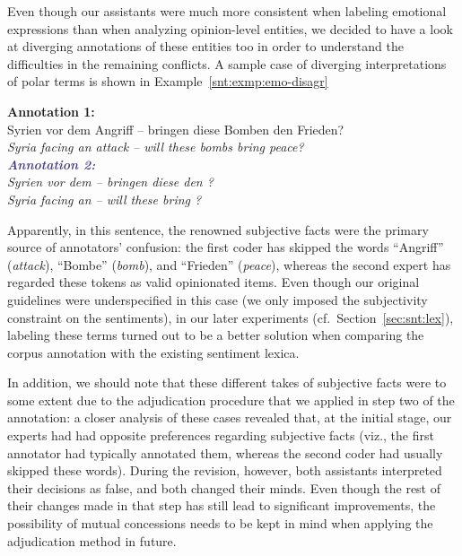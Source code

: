 Even though our assistants were much more consistent when labeling
emotional expressions than when analyzing opinion-level entities, we
decided to have a look at diverging annotations of these entities too
in order to understand the difficulties in the remaining conflicts.  A
sample case of diverging interpretations of polar terms is shown in
Example~\ref{snt:exmp:emo-disagr}

\begin{example}\label{snt:exmp:emo-disagr}
  \textcolor{red3}{\textbf{Annotation 1:}}\\ \upshape{}Syrien vor dem
  Angriff -- bringen diese Bomben den Frieden?\\[0.3em]\itshape
  \noindent\itshape{}Syria facing an attack -- will these bombs bring
  peace?\\

  \noindent\textcolor{darkslateblue}{\textbf{\itshape Annotation
      2:}}\\ \upshape{}Syrien vor dem
  \emoexpression{\textcolor{red}{Angriff}} -- bringen diese
  \emoexpression{\textcolor{red}{Bomben}} den
  \emoexpression{\textcolor{red}{Frieden}}?\\[0.3em]
  \noindent\itshape{}Syria facing an
  \upshape{}\itshape{}
  -- will these
  \upshape{}\itshape{}
  bring
  \upshape{}\itshape{}?
\end{example}

Apparently, in this sentence, the renowned subjective facts were the
primary source of annotators' confusion: the first coder has skipped
the words ``Angriff'' (\emph{attack}), ``Bombe'' (\emph{bomb}), and
``Frieden'' (\emph{peace}), whereas the second expert has regarded
these tokens as valid opinionated items.  Even though our original
guidelines were underspecified in this case (we only imposed the
subjectivity constraint on the sentiments), in our later experiments
(cf.~Section~\ref{sec:snt:lex}), labeling these terms turned out to be
a better solution when comparing the corpus annotation with the
existing sentiment lexica.

In addition, we should note that these different takes of subjective
facts were to some extent due to the adjudication procedure that we
applied in step two of the annotation: a closer analysis of these
cases revealed that, at the initial stage, our experts had had
opposite preferences regarding subjective facts (viz., the first
annotator had typically annotated them, whereas the second coder had
usually skipped these words).  During the revision, however, both
assistants interpreted their decisions as false, and both changed
their minds.  Even though the rest of their changes made in that step
has still lead to significant improvements, the possibility of mutual
concessions needs to be kept in mind when applying the adjudication
method in future.

